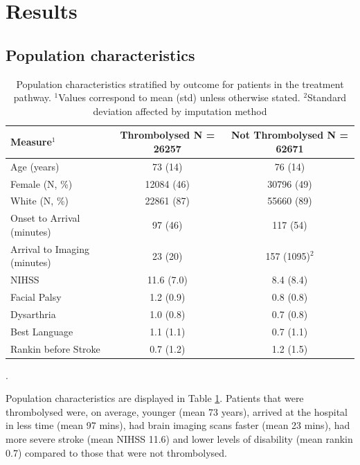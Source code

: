 \documentclass[12pt,a4paper, pdftex]{elsarticle}
\begin{document}
\section{Results}

\subsection{Population characteristics} 
    \begin{table}[h!]
        \centering
        \begin{tabular}{|l|c|c|}
        \hline
        {\bf Measure$^1$} & {\bf Thrombolysed N = 26257} & {\bf Not Thrombolysed N = 62671}  \\
        \hline
        Age (years) & 73 (14) & 76 (14)\\
        Female (N, \%) & 12084 (46) & 30796 (49)\\
        White (N, \%) & 22861 (87) & 55660 (89)\\
        Onset to Arrival (minutes) & 97 (46) & 117 (54) \\
        Arrival to Imaging (minutes) & 23 (20)  & 157 (1095)$^2$\\
        NIHSS & 11.6 (7.0) & 8.4 (8.4)\\
        Facial Palsy & 1.2 (0.9) & 0.8 (0.8)\\
        Dysarthria & 1.0 (0.8) & 0.7 (0.8)\\
        Best Language & 1.1 (1.1) & 0.7 (1.1) \\
        Rankin before Stroke & 0.7 (1.2) & 1.2 (1.5) \\
        \hline
        \end{tabular}
        \caption{Population characteristics stratified by outcome for patients in the treatment pathway. $^1$Values correspond to mean (std) unless otherwise stated. $^2$Standard deviation affected by imputation method}.
        \label{tab:1}
    \end{table}

Population characteristics are displayed in Table \ref{tab:1}. Patients that were thrombolysed were, on average, younger (mean 73 years), arrived at the hospital in less time (mean 97 mins), had brain imaging scans faster (mean 23 mins), had more severe stroke (mean NIHSS 11.6) and lower levels of disability (mean rankin 0.7) compared to those that were not thrombolysed. 
\end{document}
